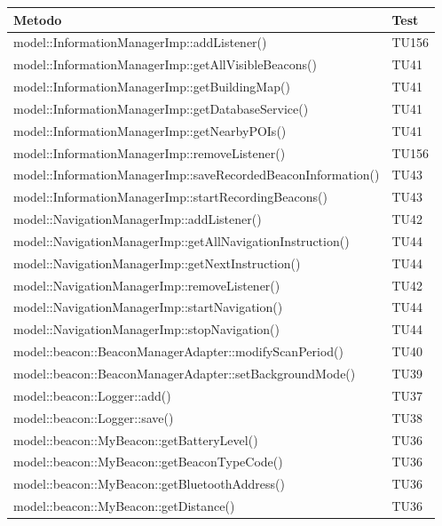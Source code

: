 \documentclass[../DefinizioneDiProdotto.tex]{subfiles}
\begin{document}
\begin{longtabu}to \textwidth{X X}
\toprule
\textbf{Metodo} & \textbf{Test}\\
\midrule
\endhead
{}
model::\-InformationManagerImp::\-addListener() & TU156 \\ 
\midrule 
model::\-InformationManagerImp::\-getAllVisibleBeacons() & TU41 \\ 
\midrule 
model::\-InformationManagerImp::\-getBuildingMap() & TU41 \\ 
\midrule 
model::\-InformationManagerImp::\-getDatabaseService() & TU41 \\ 
\midrule 
model::\-InformationManagerImp::\-getNearbyPOIs() & TU41 \\ 
\midrule 
model::\-InformationManagerImp::\-removeListener() & TU156 \\ 
\midrule 
model::\-InformationManagerImp::\-saveRecordedBeaconInformation() & TU43 \\ 
\midrule 
model::\-InformationManagerImp::\-startRecordingBeacons() & TU43 \\ 
\midrule 
model::\-NavigationManagerImp::\-addListener() & TU42 \\ 
\midrule 
model::\-NavigationManagerImp::\-getAllNavigationInstruction() & TU44 \\ 
\midrule 
model::\-NavigationManagerImp::\-getNextInstruction() & TU44 \\ 
\midrule 
model::\-NavigationManagerImp::\-removeListener() & TU42 \\ 
\midrule 
model::\-NavigationManagerImp::\-startNavigation() & TU44 \\ 
\midrule 
model::\-NavigationManagerImp::\-stopNavigation() & TU44 \\ 
\midrule 
model::\-beacon::\-BeaconManagerAdapter::\-modifyScanPeriod() & TU40 \\ 
\midrule 
model::\-beacon::\-BeaconManagerAdapter::\-setBackgroundMode() & TU39 \\ 
\midrule 
model::\-beacon::\-Logger::\-add() & TU37 \\ 
\midrule 
model::\-beacon::\-Logger::\-save() & TU38 \\ 
\midrule 
model::\-beacon::\-MyBeacon::\-getBatteryLevel() & TU36 \\ 
\midrule 
model::\-beacon::\-MyBeacon::\-getBeaconTypeCode() & TU36 \\ 
\midrule 
model::\-beacon::\-MyBeacon::\-getBluetoothAddress() & TU36 \\ 
\midrule 
model::\-beacon::\-MyBeacon::\-getDistance() & TU36 \\ 

\end{longtabu}
\end{document}
